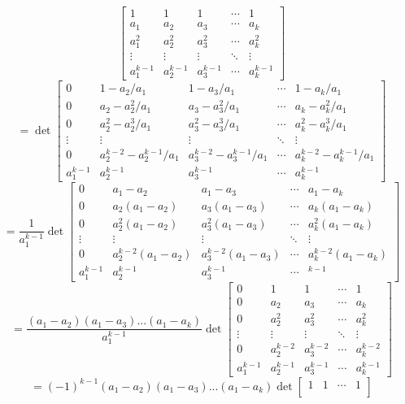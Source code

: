 \documentclass[openany]{book}
\begin{document}
\begin{description}
\begin{itemize}
$$\begin{bmatrix}
1 & 1 & 1 & \cdots & 1 \\
a_1 & a_2 & a_3 & \cdots & a_k \\
a_1^2 & a_2^2 & a_3^2 & \cdots & a_k^2 \\
\vdots & \vdots & \vdots & \ddots & \vdots \\
a_1^{k-1} & a_2^{k-1} & a_3^{k-1} & \cdots & a_k^{k-1}
\end{bmatrix}$$ 
$$= \det\begin{bmatrix}
0 & 1 - a_2/a_1 & 1 - a_3/a_1 & \cdots & 1 - a_k/a_1 \\
0 & a_2 - a_2^2/a_1 & a_3 - a_3^2/a_1 & \cdots & a_k - a_k^2/a_1 \\
0 & a_2^2 - a_2^3/a_1 & a_3^2 - a_3^3/a_1 & \cdots & a_k^2 - a_k^3/a_1 \\
\vdots & \vdots & \vdots & \ddots & \vdots \\
0 & a_2^{k-2} - a_2^{k-1}/a_1 & a_3^{k-2} - a_3^{k-1}/a_1 & \cdots & a_k^{k-2} - a_k^{k-1}/a_1 \\
a_1^{k-1} & a_2^{k-1} & a_3^{k-1} & \cdots & a_k^{k-1}
\end{bmatrix}$$
$$= \frac{1}{a_1^{k-1}}\det\begin{bmatrix}
0 & a_1 - a_2 & a_1 - a_3 & \cdots & a_1 - a_k \\
0 & a_2(a_1 - a_2) & a_3(a_1 - a_3) & \cdots & a_k(a_1 - a_k) \\
0 & a_2^2(a_1 - a_2) & a_3^2(a_1 - a_3) & \cdots & a_k^2(a_1 - a_k) \\
\vdots & \vdots & \vdots & \ddots & \vdots \\
0 & a_2^{k-2}(a_1 - a_2) & a_3^{k-2}(a_1 - a_3) & \cdots & a_k^{k-2}(a_1 - a_k) \\
a_1^{k-1} & a_2^{k-1} & a_3^{k-1} & \cdots & ^{k-1}
\end{bmatrix}$$
$$= \frac{(a_1 - a_2)(a_1 - a_3)...(a_1 - a_k)}{a_1^{k-1}}\det\begin{bmatrix}
0 & 1 & 1 & \cdots & 1 \\
0 & a_2 & a_3 & \cdots & a_k \\
0 & a_2^2 & a_3^2 & \cdots & a_k^2 \\
\vdots & \vdots & \vdots & \ddots & \vdots \\
0 & a_2^{k-2} & a_3^{k-2} & \cdots & a_k^{k-2} \\
a_1^{k-1} & a_2^{k-1} & a_3^{k-1} & \cdots & a_k^{k-1}
\end{bmatrix}$$
$$= (-1)^{k-1}(a_1 - a_2)(a_1 - a_3)...(a_1 - a_k)\det\begin{bmatrix}
1 & 1 & \cdots & 1 \\

\end{bmatrix}$$
\end{itemize}
\end{description}
\end{document}
